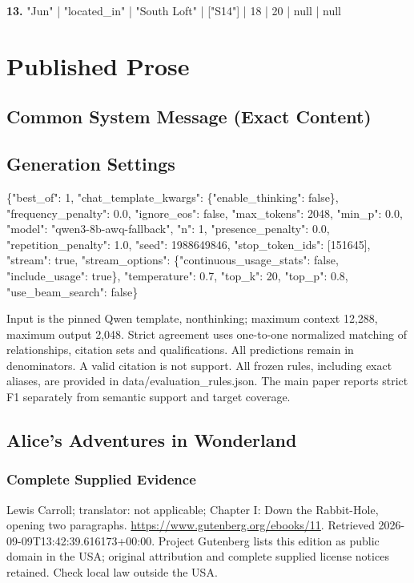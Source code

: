 \noindent\textbf{13.} "Jun" | "located\_in" | "South Loft" | ["S14"] | 18 | 20 | null | null\par\smallskip

\clearpage\section*{Published Prose}

\subsection*{Common System Message (Exact Content)}


\subsection*{Generation Settings}

\{"best\_of": 1, "chat\_template\_kwargs": \{"enable\_thinking": false\}, "frequency\_penalty": 0.0, "ignore\_eos": false, "max\_tokens": 2048, "min\_p": 0.0, "model": "qwen3-8b-awq-fallback", "n": 1, "presence\_penalty": 0.0, "repetition\_penalty": 1.0, "seed": 1988649846, "stop\_token\_ids": [151645], "stream": true, "stream\_options": \{"continuous\_usage\_stats": false, "include\_usage": true\}, "temperature": 0.7, "top\_k": 20, "top\_p": 0.8, "use\_beam\_search": false\}

Input is the pinned Qwen template, nonthinking; maximum context 12,288, maximum output 2,048. Strict agreement uses one-to-one normalized matching of relationships, citation sets and qualifications. All predictions remain in denominators. A valid citation is not support. All frozen rules, including exact aliases, are provided in data/evaluation\_rules.json. The main paper reports strict F1 separately from semantic support and target coverage.

\clearpage\subsection*{Alice's Adventures in Wonderland}

\subsubsection*{Complete Supplied Evidence}

Lewis Carroll; translator: not applicable; Chapter I: Down the Rabbit-Hole, opening two paragraphs. \url{https://www.gutenberg.org/ebooks/11}. Retrieved 2026-09-09T13:42:39.616173+00:00. Project Gutenberg lists this edition as public domain in the USA; original attribution and complete supplied license notices retained. Check local law outside the USA.

